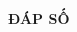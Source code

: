 \newpage

\begin{center}
	
	\textbf{ĐÁP SỐ}
	
\end{center}
\begin{multicols}{10}
	
	\setlength{\columnseprule}{0pt}
	
\end{multicols}


